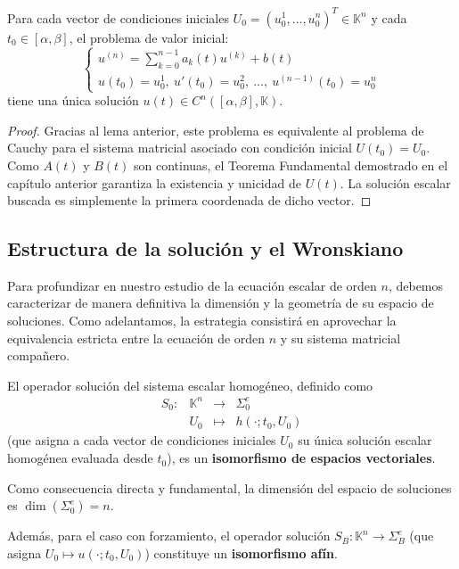 \begin{corolario}
    Para cada vector de condiciones iniciales $U_0 = (u_0^1, \dots, u_0^n)^T \in \mathbb{K}^n$ y cada $t_0 \in [\alpha, \beta]$, el problema de valor inicial:
    \[
        \begin{cases}
            u^{(n)} = \sum_{k=0}^{n-1} a_k(t) u^{(k)} + b(t) \\
            u(t_0) = u_0^1, \ u'(t_0) = u_0^2, \ \dots, \ u^{(n-1)}(t_0) = u_0^n
        \end{cases}
    \]
    tiene una única solución $u(t) \in C^n([\alpha, \beta], \mathbb{K})$.
\end{corolario}

\begin{proof}
    Gracias al lema anterior, este problema es equivalente al problema de Cauchy para el sistema matricial asociado con condición inicial $U(t_0) = U_0$. Como $A(t)$ y $B(t)$ son continuas, el Teorema Fundamental demostrado en el capítulo anterior garantiza la existencia y unicidad de $U(t)$. La solución escalar buscada es simplemente la primera coordenada de dicho vector.
\end{proof}

\subsection{Estructura de la solución y el Wronskiano}

Para profundizar en nuestro estudio de la ecuación escalar de orden $n$, debemos caracterizar de manera definitiva la dimensión y la geometría de su espacio de soluciones. Como adelantamos, la estrategia consistirá en aprovechar la equivalencia estricta entre la ecuación de orden $n$ y su sistema matricial compañero.

\begin{teorema}
    El operador solución del sistema escalar homogéneo, definido como
    \[
        \begin{matrix}
            S_0 : & \mathbb{K}^n & \to & \Sigma_0^e \\
            & U_0 & \mapsto & h(\cdot; t_0, U_0)
        \end{matrix}
    \]
    (que asigna a cada vector de condiciones iniciales $U_0$ su única solución escalar homogénea evaluada desde $t_0$), es un \textbf{isomorfismo de espacios vectoriales}. 
    
    Como consecuencia directa y fundamental, la dimensión del espacio de soluciones es $\dim(\Sigma_0^e) = n$. 
    
    Además, para el caso con forzamiento, el operador solución $S_B : \mathbb{K}^n \to \Sigma_B^e$ (que asigna $U_0 \mapsto u(\cdot; t_0, U_0)$) constituye un \textbf{isomorfismo afín}.
\end{teorema}

